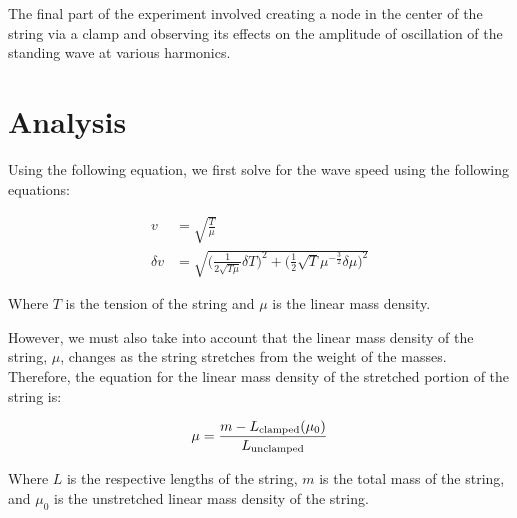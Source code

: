 \documentclass[twoside,twocolumn]{article}
\begin{document}
\noindent The final part of the experiment involved creating a node in the center of the string via a clamp and observing its effects on the amplitude of oscillation of the standing wave at various harmonics.


\section{Analysis}

Using the following equation, we first solve for the wave speed using the following equations:

\footnotesize
\begin{align}
v &= \sqrt{\frac{T}{\mu}} \\
\delta v &= \sqrt{\bigg (\frac{1}{2\sqrt{T\mu}}\delta T \bigg )^2 + \bigg(\frac{1}{2}\sqrt{T}\mu ^{-\frac{3}{2}}\delta \mu \bigg )^2}
\end{align}
\normalsize

\noindent Where $T$ is the tension of the string and $\mu$ is the linear mass density.

\noindent However, we must also take into account that the linear mass density of the string, $\mu$, changes as the string stretches from the weight of the masses. Therefore, the equation for the linear mass density of the stretched portion of the string is:

\footnotesize
\begin{align}
\mu = \frac{m - L\textsubscript{clamped}(\mu_0)}{L\textsubscript{unclamped}}
\end{align}
\normalsize

\noindent Where $L$ is the respective lengths of the string, $m$ is the total mass of the string, and $\mu_0$ is the unstretched linear mass density of the string.


\begin{table}[!htbp]
\caption{String Data for Various Masses}
\centering
{}
\end{table}
\end{document}
